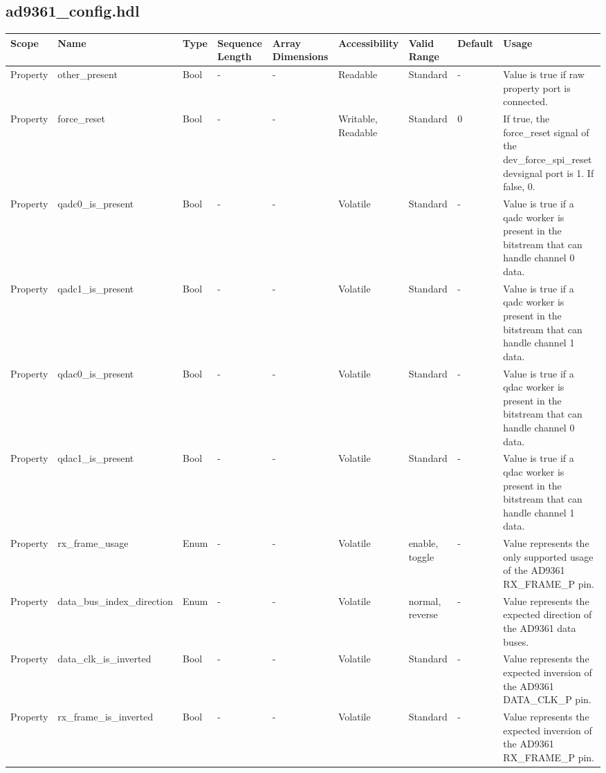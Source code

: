 \documentclass{article}
\def\comp{ad9361\_config}
\begin{document}
\begin{landscape}
\begin{scriptsize}
  \subsection*{\comp.hdl}
      \begin{longtable}{|p{2cm}|p{5cm}|p{1cm}|p{1.1cm}|p{1.4cm}|p{1.75cm}|p{1.5cm}|p{1.5cm}|p{5.24cm}|}
      \hline
      \rowcolor{blue}
      Scope    & Name  & Type  & Sequence Length & Array Dimensions & Accessibility & Valid Range & Default & Usage \\
      \hline
      Property & other\_present & Bool & - & - & Readable & Standard & - & Value is true if raw property port is connected. \\
      \hline
      Property & force\_reset & Bool & - & - & Writable, Readable  & Standard & 0 & If true, the force\_reset signal of the dev\_force\_spi\_reset devsignal port is 1. If false, 0. \\
      \hline
      Property & qadc0\_is\_present & Bool & - & - & Volatile & Standard & - & Value is true if a qadc worker is present in the bitstream that can handle channel 0 data. \\
      \hline
      Property & qadc1\_is\_present & Bool & - & - & Volatile & Standard & - & Value is true if a qadc worker is present in the bitstream that can handle channel 1 data. \\
      \hline
      Property & qdac0\_is\_present & Bool & - & - & Volatile & Standard & - & Value is true if a qdac worker is present in the bitstream that can handle channel 0 data.  \\
      \hline
      Property & qdac1\_is\_present & Bool & - & - & Volatile & Standard & - & Value is true if a qdac worker is present in the bitstream that can handle channel 1 data. \\
      \hline
      Property & rx\_frame\_usage & Enum & - & - & Volatile & enable, toggle & - & Value represents the only supported usage of the AD9361 RX\_FRAME\_P pin. \\
      \hline
      Property & data\_bus\_index\_direction & Enum & - & - & Volatile & normal, reverse & - & Value represents the expected direction of the AD9361 data buses. \\
      \hline
      Property & data\_clk\_is\_inverted & Bool & - & - & Volatile & Standard & - & Value represents the expected inversion of the AD9361 DATA\_CLK\_P pin.\\
      \hline
      Property & rx\_frame\_is\_inverted & Bool & - & - & Volatile & Standard & - & Value represents the expected inversion of the AD9361 RX\_FRAME\_P pin.\\

\end{longtable}
\end{scriptsize}
\end{landscape}
\end{document}
